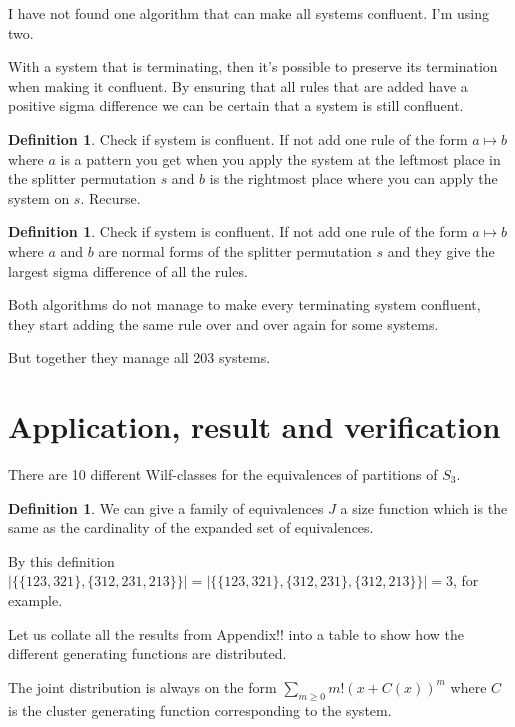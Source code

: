 \documentclass[openany, a4paper, 11pt, english]{article}
\newcommand{\patternrule}{ \mapsto \!}
\theoremstyle{definition}
\newtheorem{definition}[theorem]{Definition}
\begin{document}
I have not found one algorithm that can make all systems confluent.
I'm using two.

With a system that is terminating, then it's possible to preserve its
termination when making it confluent.
By ensuring that all rules that are added have a positive sigma difference
we can be certain that a system is still confluent. 

\begin{definition}
    Check if system is confluent. If not add one rule of the form $a
    \patternrule b$ where $a$ is a pattern you get when you apply the system at
    the leftmost place in the splitter permutation $s$ and $b$ is the rightmost
    place where you can apply the system on $s$. Recurse.
\end{definition}

\begin{definition}
    Check if system is confluent. If not add one rule of the form $a
    \patternrule b$ where $a$ and $b$ are normal forms of the splitter
    permutation $s$ and they give the largest sigma difference of all the rules.
\end{definition}

Both algorithms do not manage to make every terminating system confluent, they
start adding the same rule over and over again for some systems.

But together they manage all 203 systems.

\section{Application, result and verification}
There are 10 different Wilf-classes for the equivalences of partitions of $S_3$.

\begin{definition}
    We can give a family of equivalences $J$ a size function which is the same
    as the cardinality of the expanded set of equivalences.

    By this definition $| \{ \{ 123, 321 \}, \{ 312, 231, 213 \} \}| = | \{ \{
    123, 321 \}, \{ 312, 231 \}, \{ 312, 213 \} \} | = 3$, for example.
\end{definition}

Let us collate all the results from Appendix!! into a table to show how the
different generating functions are distributed.

The joint distribution is always on the form $\sum_{m \geq 0}m!(x+C(x))^m$ where $C$
is the cluster generating function corresponding to the system.
\end{document}
